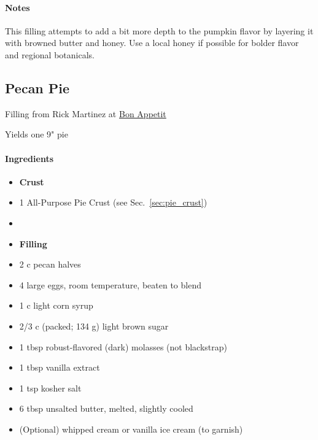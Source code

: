 \documentclass[12pt]{article}
\newenvironment*{ingredients}
	{
		\paragraph*{Ingredients}
		\begin{itemize}
	}
	{
		\end{itemize}
	}
\newenvironment*{notes}
	{
		\paragraph*{Notes}
		\begin{adjustwidth}{1cm}{}
	}
	{
		\end{adjustwidth}
	}
\begin{document}
	\begin{notes}
		This filling attempts to add a bit more depth to the pumpkin flavor by layering it with browned butter and honey. Use a local honey if possible for bolder flavor and regional botanicals.
	\end{notes}
	
	\newpage
	
	\subsection{Pecan Pie}
	Filling from Rick Martinez at \href{https://www.bonappetit.com/recipe/bas-best-pecan-pie}{Bon Appetit}
	
	Yields one 9" pie
	
	\begin{ingredients}
		\item[] \textbf{Crust}
		\item 1 All-Purpose Pie Crust (see Sec.~\ref{sec:pie_crust})
		\item[] \hfill
		\item[] \textbf{Filling}
		\item 2 c pecan halves
		\item 4 large eggs, room temperature, beaten to blend
		\item 1 c light corn syrup
		\item 2/3 c (packed; 134 g) light brown sugar
		\item 1 tbsp robust-flavored (dark) molasses (not blackstrap)
		\item 1 tbsp vanilla extract
		\item 1 tsp kosher salt
		\item 6 tbsp unsalted butter, melted, slightly cooled
		\item (Optional) whipped cream or vanilla ice cream (to garnish)
	\end{ingredients}
	
\end{document}
